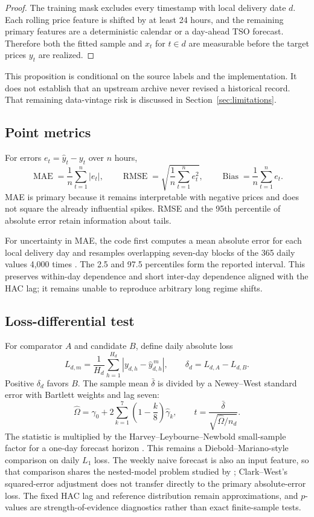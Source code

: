 \documentclass[11pt]{article}
\newcommand{\MAE}{\operatorname{MAE}}
\newcommand{\RMSE}{\operatorname{RMSE}}
\begin{document}
\begin{proof}
The training mask excludes every timestamp with local delivery date $d$.
Each rolling price feature is shifted by at least 24 hours, and the remaining
primary features are a deterministic calendar or a day-ahead TSO forecast.
Therefore both the fitted sample and $x_t$ for $t\in d$ are measurable before
the target prices $y_t$ are realized.
\end{proof}

This proposition is conditional on the source labels and the implementation.
It does not establish that an upstream archive never revised a historical
record.  That remaining data-vintage risk is discussed in
Section~\ref{sec:limitations}.

\subsection{Point metrics}

For errors $e_t=\widehat y_t-y_t$ over $n$ hours,
\[
  \MAE=\frac{1}{n}\sum_{t=1}^{n}|e_t|,
  \qquad
  \RMSE=\sqrt{\frac{1}{n}\sum_{t=1}^{n}e_t^2},
  \qquad
  \operatorname{Bias}=\frac{1}{n}\sum_{t=1}^{n}e_t.
\]
MAE is primary because it remains interpretable with negative prices and
does not square the already influential spikes.  RMSE and the 95th percentile
of absolute error retain information about tails.

For uncertainty in MAE, the code first computes a mean absolute error for each
local delivery day and resamples overlapping seven-day blocks of the 365 daily
values 4,000 times \cite{kunsch1989}. The 2.5 and 97.5 percentiles form the
reported interval. This preserves within-day dependence and short inter-day
dependence aligned with the HAC lag; it remains unable to reproduce arbitrary
long regime shifts.

\subsection{Loss-differential test}

For comparator $A$ and candidate $B$, define daily absolute loss
\[
  L_{d,m}=\frac{1}{H_d}\sum_{h=1}^{H_d}
  |y_{d,h}-\widehat y^{\,m}_{d,h}|,
  \qquad
  \delta_d=L_{d,A}-L_{d,B}.
\]
Positive $\delta_d$ favors $B$.  The sample mean $\bar\delta$ is divided by a
Newey--West standard error with Bartlett weights and lag seven:
\[
  \widehat\Omega
  =\widehat\gamma_0+
   2\sum_{k=1}^{7}\left(1-\frac{k}{8}\right)\widehat\gamma_k,
  \qquad
  t=\frac{\bar\delta}{\sqrt{\widehat\Omega/n_d}}.
\]
The statistic is multiplied by the Harvey--Leybourne--Newbold small-sample
factor for a one-day forecast horizon \cite{harvey1997}. This remains a
Diebold--Mariano-style comparison on daily $L_1$ loss. The weekly naive
forecast is also an input feature, so that comparison shares the nested-model
problem studied by \cite{clarkwest2007}; Clark--West's squared-error adjustment
does not transfer directly to the primary absolute-error loss. The fixed HAC
lag and reference distribution remain approximations, and $p$-values are
strength-of-evidence diagnostics rather than exact finite-sample tests.
\end{document}

